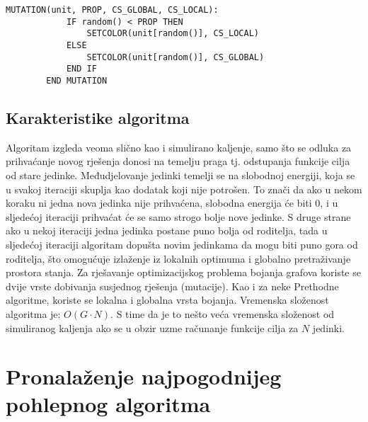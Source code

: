 \documentclass[times, utf8, diplomski, numeric]{fer}
\begin{document}
\begin{singlespace}
	\begin{lstlisting}[caption=Pseudok\^{o}d mutacije genetskog kaljenja]
		MUTATION(unit, PROP, CS_GLOBAL, CS_LOCAL):
			IF random() < PROP THEN
				SETCOLOR(unit[random()], CS_LOCAL)				
			ELSE
				SETCOLOR(unit[random()], CS_GLOBAL)
			END IF
		END MUTATION
	\end{lstlisting}
\end{singlespace}


\subsection{Karakteristike algoritma}

Algoritam izgleda veoma slično kao i simulirano kaljenje, samo što se odluka za prihvaćanje novog rješenja donosi na temelju praga tj. odstupanja funkcije cilja od stare jedinke. Međudjelovanje jedinki temelji se na slobodnoj energiji, koja se u svakoj iteraciji skuplja kao dodatak koji nije potrošen. To znači da ako u nekom koraku ni jedna nova jedinka nije prihvaćena, slobodna energija će biti $0$, i u sljedećoj iteraciji prihvaćat će se samo strogo bolje nove jedinke. S druge strane ako u nekoj iteraciji jedna jedinka postane puno bolja od roditelja, tada u sljedećoj iteraciji algoritam dopušta novim jedinkama da mogu biti puno gora od roditelja, što omogućuje izlaženje iz lokalnih optimuma i globalno pretraživanje prostora stanja. Za rješavanje optimizacijskog problema bojanja grafova koriste se dvije vrste dobivanja susjednog rješenja (mutacije). Kao i za neke Prethodne algoritme, koriste se lokalna i globalna vrsta bojanja.  
Vremenska složenost algoritma je: $O(G \cdot N)$. S time da je to nešto veća vremenska složenost od simuliranog kaljenja ako se u obzir uzme računanje funkcije cilja za $N$ jedinki.

\section{Pronalaženje najpogodnijeg pohlepnog algoritma}
\end{document}
